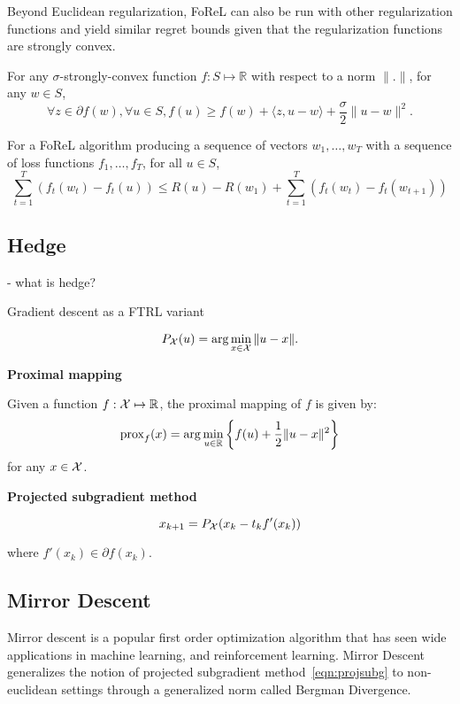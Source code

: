 Beyond Euclidean regularization, FoReL can also be run with other regularization functions and
yield similar regret bounds given that the regularization functions are strongly convex.

\begin{definition}
	For any $\sigma$-strongly-convex function $f: S \mapsto \mathbb{R}$ with respect to a norm $\|.
		\|$, for any $w \in S$,
	\begin{equation}
		\forall z \in \partial f(w), \forall u \in S, f(u) \geq f(w) + \langle z, u - w\rangle + \frac{\sigma}{2}\| u - w \|^2.
	\end{equation}
\end{definition}

\begin{lemma}
	\label{lem:forelrb}
	For a FoReL algorithm producing a sequence of vectors $w_1, \ldots, w_T$ with a sequence of loss
	functions $f_1, \ldots, f_T$, for all $u \in S$, $$\sum_{t=1}^T (f_t(w_t) - f_t(u)) \leq R(u) -
		R(w_1) + \sum_{t=1}^T (f_t(w_t) - f_t(w_{t+1}))$$
\end{lemma}

\subsection{Hedge} - what is hedge?

Gradient descent as a FTRL variant

\begin{equation}
	\label{eqn:eucproj}
	P_{\mathcal{X}}(u) = \arg \min_{x \in \mathcal{X}} \| u - x \|.
\end{equation}

\textbf{Proximal mapping}
\begin{definition} Given a function $f: \mathcal{X} \mapsto \mathbb{R}$, the proximal mapping
	of $f$ is given by: $$\text{prox}_f(x) = \arg \min_{u \in \mathbb{R}} \left\{ f(u) + \frac{1}{2} \| u-x
		\|^2 \right\} $$ for any $x \in \mathcal{X}$.
\end{definition}

\textbf{Projected subgradient method}

\begin{equation}
	\label{eqn:projsubg}
	x_{k+1} = P_{\mathcal{X}}(x_k - t_k f'(x_k))
\end{equation}

where $f'(x_k) \in \partial f(x_k)$.

\subsection{Mirror Descent}
Mirror descent is a popular first order optimization algorithm that has seen wide applications in
machine learning, and reinforcement learning.
Mirror Descent generalizes the notion of projected subgradient method~\ref{eqn:projsubg} to
non-euclidean settings through a generalized norm called Bergman Divergence.

